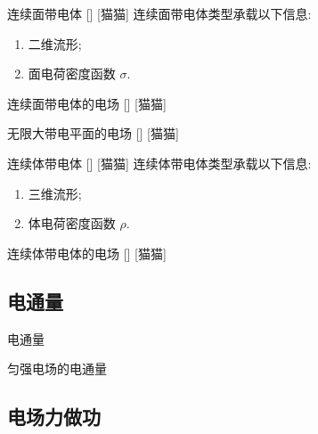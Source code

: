 \documentclass[UTF8]{ctexart}
\begin{document}
        \begin{dfn}
            []
            {连续面带电体}
            []
            [猫猫]
            连续面带电体类型承载以下信息: 
            \begin{enumerate}
                \item 二维流形; 
                \item 面电荷密度函数 \(\sigma\). 
            \end{enumerate}
        \end{dfn}
        
        \begin{ppt}
            []
            {连续面带电体的电场}
            []
            [猫猫]
        \end{ppt}
        
        \begin{xmp}
            []
            {无限大带电平面的电场}
            []
            [猫猫]
        \end{xmp}
        
        \begin{dfn}
            []
            {连续体带电体}
            []
            [猫猫]
            连续体带电体类型承载以下信息: 
            \begin{enumerate}
                \item 三维流形; 
                \item 体电荷密度函数 \(\rho\). 
            \end{enumerate}
        \end{dfn}
        
        \begin{ppt}
            []
            {连续体带电体的电场}
            []
            [猫猫]
        \end{ppt}

    \subsection{电通量}
        
        \begin{dfn}
            {电通量}
        \end{dfn}
        
        \begin{ppt}
            {匀强电场的电通量}
        \end{ppt}

    \subsection{电场力做功}
\end{document}
